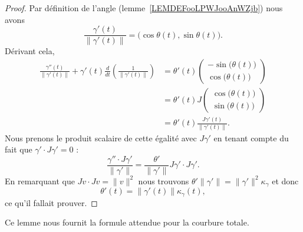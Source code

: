 \begin{proof}
	Par définition de l'angle (lemme~\ref{LEMDEFooLPWJooAnWZjb}) nous avons
	\begin{equation}
		\frac{ \gamma'(t) }{ \| \gamma'(t) \| }=\big( \cos\theta(t),\sin\theta(t) \big).
	\end{equation}
	Dérivant cela,
	\begin{subequations}
		\begin{align}
			\frac{ \gamma''(t) }{ \| \gamma'(t) \| }+\gamma'(t)\frac{ d  }{ dt }\left( \frac{1}{ \| \gamma'(t) \| } \right) & =\theta'(t)
			\begin{pmatrix}
				-\sin\big( \theta(t) \big) \\
				\cos\big( \theta(t) \big)
			\end{pmatrix}                                                                                                                                             \\
			                                                                                                                & =\theta'(t)J\begin{pmatrix}
				                                                                                                                              \cos\big( \theta(t) \big) \\
				                                                                                                                              \sin\big( \theta(t) \big)
			                                                                                                                              \end{pmatrix}                \\
			                                                                                                                & =\theta'(t)\frac{ J\gamma'(t) }{ \| \gamma'(t) \| }.
		\end{align}
	\end{subequations}
	Nous prenons le produit scalaire de cette égalité avec \( J\gamma'\) en tenant compte du fait que \( \gamma'\cdot J\gamma'=0\) :
	\begin{equation}
		\frac{ \gamma''\cdot J\gamma' }{ \| \gamma' \| }=\frac{ \theta' }{ \| \gamma' \| }J\gamma'\cdot J\gamma'.
	\end{equation}
	En remarquant que \( Jv\cdot Jv=\| v \|^2\) nous trouvons \( \theta'\| \gamma' \|=\| \gamma' \|^2\kappa_{\gamma}\) et donc
	\begin{equation}
		\theta'(t)=\| \gamma'(t) \|\kappa_{\gamma}(t),
	\end{equation}
	ce qu'il fallait prouver.
\end{proof}
Ce lemme nous fournit la formule attendue pour la courbure totale.

